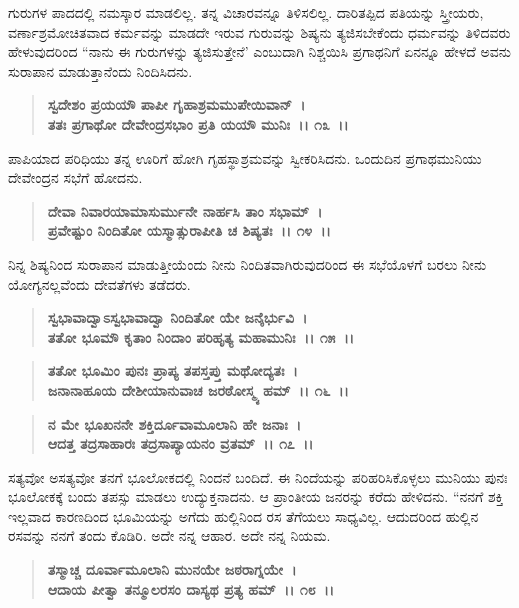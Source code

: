 ಗುರುಗಳ ಪಾದದಲ್ಲಿ ನಮಸ್ಕಾರ ಮಾಡಲಿಲ್ಲ. ತನ್ನ ವಿಚಾರವನ್ನೂ ತಿಳಿಸಲಿಲ್ಲ. ದಾರಿತಪ್ಪಿದ ಪತಿಯನ್ನು ಸ್ತ್ರೀಯರು, ವರ್ಣಾಶ್ರಮೋಚಿತವಾದ ಕರ್ಮವನ್ನು ಮಾಡದೇ ಇರುವ ಗುರುವನ್ನು ಶಿಷ್ಯನು ತ್ಯಜಿಸಬೇಕೆಂದು ಧರ್ಮವನ್ನು ತಿಳಿದವರು ಹೇಳುವುದರಿಂದ “ನಾನು ಈ ಗುರುಗಳನ್ನು ತ್ಯಜಿಸುತ್ತೇನೆ' ಎಂಬುದಾಗಿ ನಿಶ್ಚಯಿಸಿ ಪ್ರಗಾಥನಿಗೆ ಏನನ್ನೂ ಹೇಳದೆ ಅವನು ಸುರಾಪಾನ ಮಾಡುತ್ತಾನೆಂದು ನಿಂದಿಸಿದನು.

\begin{verse}
\textbf{ಸ್ವದೇಶಂ ಪ್ರಯಯೌ ಪಾಪೀ ಗೃಹಾಶ್ರಮಮುಪೇಯಿವಾನ್~।}\\\textbf{ತತಃ ಪ್ರಗಾಥೋ ದೇವೇಂದ್ರಸಭಾಂ ಪ್ರತಿ ಯಯೌ ಮುನಿಃ~।। ೧೩~।।}
\end{verse}

ಪಾಪಿಯಾದ ಪರಿಧಿಯು ತನ್ನ ಊರಿಗೆ ಹೋಗಿ ಗೃಹಸ್ಥಾಶ್ರಮವನ್ನು ಸ್ವೀಕರಿಸಿದನು. ಒಂದುದಿನ ಪ್ರಗಾಥಮುನಿಯು ದೇವೇಂದ್ರನ ಸಭೆಗೆ ಹೋದನು.

\begin{verse}
\textbf{ದೇವಾ ನಿವಾರಯಾಮಾಸುರ್ಮುನೇ ನಾರ್ಹಸಿ ತಾಂ ಸಭಾಮ್~।}\\\textbf{ಪ್ರವೇಷ್ಟುಂ ನಿಂದಿತೋ ಯಸ್ಮಾತ್ಸುರಾಪೀತಿ ಚ ಶಿಷ್ಯತಃ~।। ೧೪~।।}
\end{verse}

ನಿನ್ನ ಶಿಷ್ಯನಿಂದ ಸುರಾಪಾನ ಮಾಡುತ್ತೀಯೆಂದು ನೀನು ನಿಂದಿತವಾಗಿರುವುದರಿಂದ ಈ ಸಭೆಯೊಳಗೆ ಬರಲು ನೀನು ಯೋಗ್ಯನಲ್ಲವೆಂದು ದೇವತೆಗಳು ತಡೆದರು.

\begin{verse}
\textbf{ಸ್ವಭಾವಾದ್ವಾಽಸ್ವಭಾವಾದ್ವಾ ನಿಂದಿತೋ ಯೇ ಜನೈರ್ಭುವಿ~।}\\\textbf{ತತೋ ಭೂಮೌ ಕೃತಾಂ ನಿಂದಾಂ ಪರಿಹೃತ್ಯ ಮಹಾಮುನಿಃ~।। ೧೫~।। }
\end{verse}

\begin{verse}
\textbf{ತತೋ ಭೂಮಿಂ ಪುನಃ ಪ್ರಾಪ್ಯ ತಪಸ್ತಪ್ತು ಮಥೋದ್ಯತಃ~।}\\\textbf{ಜನಾನಾಹೂಯ ದೇಶೀಯಾನುವಾಚ ಜರಠೋಸ್ಮ್ಯ ಹಮ್~।। ೧೬~।।} 
\end{verse}

\begin{verse}
\textbf{ನ ಮೇ ಭೂಖನನೇ ಶಕ್ತಿರ್ದೂವಾಮೂಲಾನಿ ಹೇ ಜನಾಃ~।}\\\textbf{ಆದತ್ತ ತದ್ರಸಾಹಾರಃ ತದ್ರಸಾಪ್ಯಾಯನಂ ವ್ರತಮ್~।। ೧೭~।।}
\end{verse}

ಸತ್ಯವೋ ಅಸತ್ಯವೋ ತನಗೆ ಭೂಲೋಕದಲ್ಲಿ ನಿಂದನೆ ಬಂದಿದೆ. ಈ ನಿಂದೆಯನ್ನು ಪರಿಹರಿಸಿಕೊಳ್ಳಲು ಮುನಿಯು ಪುನಃ ಭೂಲೋಕಕ್ಕೆ ಬಂದು ತಪಸ್ಸು ಮಾಡಲು ಉದ್ಯುಕ್ತನಾದನು. ಆ ಪ್ರಾಂತೀಯ ಜನರನ್ನು ಕರೆದು ಹೇಳಿದನು. “ನನಗೆ ಶಕ್ತಿ ಇಲ್ಲವಾದ ಕಾರಣದಿಂದ ಭೂಮಿಯನ್ನು ಅಗೆದು ಹುಲ್ಲಿನಿಂದ ರಸ ತೆಗೆಯಲು ಸಾಧ್ಯವಿಲ್ಲ. ಆದುದರಿಂದ ಹುಲ್ಲಿನ ರಸವನ್ನು ನನಗೆ ತಂದು ಕೊಡಿರಿ. ಅದೇ ನನ್ನ ಆಹಾರ. ಅದೇ ನನ್ನ ನಿಯಮ.

\begin{verse}
\textbf{ತಸ್ಮಾಚ್ಚ ದೂರ್ವಾಮೂಲಾನಿ ಮುನಯೇ ಜಠರಾಗ್ನಯೇ~।}\\\textbf{ಆದಾಯ ಪೀತ್ವಾ ತನ್ಮೂಲರಸಂ ದಾಸ್ಯಥ ಪ್ರತ್ಯ ಹಮ್~।। ೧೮~।। }
\end{verse}

